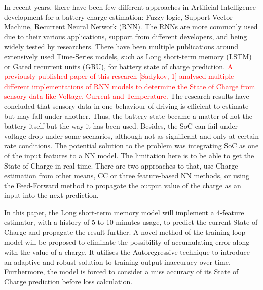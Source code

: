 %
%
In recent years, there have been few different approaches in Artificial Intelligence development for a battery charge estimation: Fuzzy logic, Support Vector Machine, Recurrent Neural Network (RNN).
The RNNs are more commonly used due to their various applications, support from different developers, and being widely tested by researchers.
There have been multiple publications around extensively used Time-Series models, such as Long short-term memory (LSTM) or Gated recurrent units (GRU), for battery state of charge prediction.
\textcolor{red}{A previously published paper of this research [Sadykov, 1] analysed multiple different implementations of RNN models to determine the State of Charge from sensory data like Voltage, Current and Temperature.}
The research results have concluded that sensory data in one behaviour of driving is efficient to estimate but may fall under another.
Thus, the battery state became a matter of not the battery itself but the way it has been used.
Besides, the SoC can fail under-voltage drop under some scenarios, although not as significant and only at certain rate conditions.
The potential solution to the problem was integrating SoC as one of the input features to a NN model.
The limitation here is to be able to get the State of Charge in real-time.
There are two approaches to that, use Charge estimation from other means, CC or three feature-based NN methods, or using the Feed-Forward method to propagate the output value of the charge as an input into the next prediction.

%
%
In this paper, the Long short-term memory model will implement a 4-feature estimator, with a history of 5 to 10 minutes usage, to predict the current State of Charge and propagate the result further.
A novel method of the training loop model will be proposed to eliminate the possibility of accumulating error along with the value of a charge.
It utilises the Autoregressive technique to introduce an adaptive and robust solution to training output inaccuracy over time.
Furthermore, the model is forced to consider a miss accuracy of its State of Charge prediction before loss calculation.

